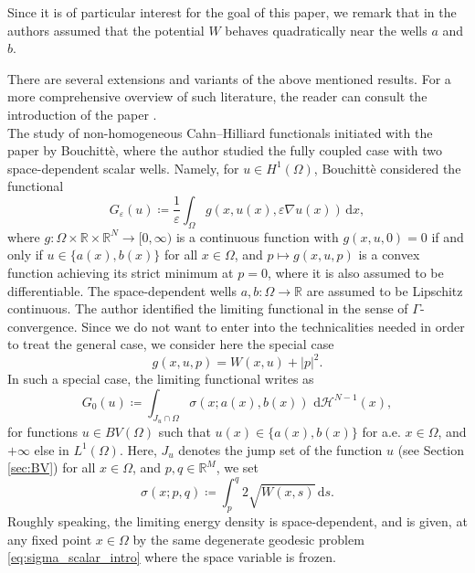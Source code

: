 \documentclass[a4paper, 11pt, reqno]{amsart}
\theoremstyle{plain}
\theoremstyle{definition}
\theoremstyle{remark}
\newcommand{\R}{\mathbb R}
\newcommand{\dd}{\,\mathrm{d}}
\newcommand{\dhno}{\,\dd{\mathcal H}^{N-1}}
\begin{document}
Since it is of particular interest for the goal of this paper, we remark that in \cite{FonTar} the authors assumed that the potential $W$ behaves quadratically near the wells $a$ and $b$.

There are several extensions and variants of the above mentioned results.
For a more comprehensive overview of such literature, the reader can consult the introduction of the paper \cite{cristoferi2025phaseseparationmultiplyperiodic}.\\

The study of non-homogeneous Cahn--Hilliard functionals initiated with the paper \cite{Bou} by Bouchitt\`{e}, where the author studied the fully coupled case with two space-dependent scalar wells.
Namely, for $u\in H^1(\Omega)$, Bouchitt\`{e} considered the functional
\[
G_\varepsilon(u) \coloneqq \frac{1}{\varepsilon}\int_\Omega g(x, u(x), \varepsilon\nabla u(x))\dd x,
\]
where $g:\Omega\times\R\times\R^N\to[0,\infty)$ is a continuous function with $g(x,u,0)=0$ if and only if $u\in\{a(x), b(x)\}$ for all $x\in\Omega$, and $p\mapsto g(x,u,p)$ is a convex function achieving its strict minimum at $p=0$, where it is also assumed to be differentiable.
The space-dependent wells $a,b:\Omega\to\R$ are assumed to be Lipschitz continuous.
The author identified the limiting functional in the sense of $\Gamma$-convergence. Since we do not want to enter into the technicalities needed in order to treat the general case, we consider here the special case
\[
g(x,u,p) = W(x,u) + |p|^2.
\]
In such a special case, the limiting functional writes as
\[
G_0(u)\coloneqq \int_{J_u\cap\Omega} \sigma(x; a(x), b(x))\dhno(x),
\]
for functions $u\in BV(\Omega)$ such that $u(x)\in\{a(x),b(x)\}$ for a.e. $x\in\Omega$, and $+\infty$ else in $L^1(\Omega)$.
Here, $J_u$ denotes the jump set of the function $u$ (see Section \ref{sec:BV}) for all $x\in\Omega$, and $p,q\in\R^M$, we set
\begin{equation}\label{eq:sigma_moving_scalar}
\sigma(x;p,q)\coloneqq \int_p^q 2\sqrt{W(x,s)}\dd s.
\end{equation}
Roughly speaking, the limiting energy density is space-dependent, and is given, at any fixed point $x\in \Omega$ by the same degenerate geodesic problem \eqref{eq:sigma_scalar_intro} where the space variable is frozen.
\end{document}
